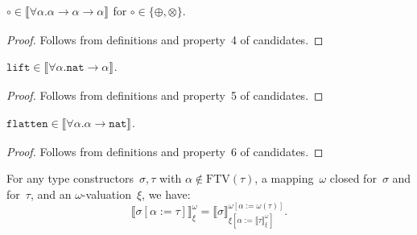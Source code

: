 \documentclass[a4paper,UKenglish,cleveref,autoref,numberwithinsect]{lipics-v2019}
\theoremstyle{definition}
\newcommand{\arrtype}{\rightarrow}
\newcommand{\subst}[2]{#1:=#2}
\newcommand{\nat}{\mathtt{nat}}
\newcommand{\flatten}{\mathtt{flatten}}
\newcommand{\lift}{\mathtt{lift}}
\newcommand{\FTV}{\mathrm{FTV}}
\newcommand{\val}[3]{\ensuremath{\llbracket#1\rrbracket_{#2}^{#3}}}
\begin{document}
\begin{lemma}\label{lem_circ}
  $\circ \in \val{\forall\alpha . \alpha \arrtype \alpha \arrtype
    \alpha}{}{}$ for $\circ \in \{ \oplus, \otimes \}$.
\end{lemma}

\begin{proof}
  Follows from definitions and property~4 of candidates.
\end{proof}

\begin{lemma}\label{lem_lift}
  $\lift \in \val{\forall\alpha.\nat\arrtype\alpha}{}{}$.
\end{lemma}

\begin{proof}
  Follows from definitions and property~5 of candidates.
\end{proof}

\begin{lemma}\label{lem_flatten}
  $\flatten \in \val{\forall\alpha.\alpha\arrtype\nat}{}{}$.
\end{lemma}

\begin{proof}
  Follows from definitions and property~6 of candidates.
\end{proof}

\begin{lemma}\label{lem_val_subst}
  For any type constructors~$\sigma,\tau$ with $\alpha \notin
  \FTV(\tau)$, a mapping~$\omega$ closed for~$\sigma$ and for~$\tau$,
  and an $\omega$-valuation~$\xi$, we have:
  \[
  \val{\sigma[\subst{\alpha}{\tau}]}{\xi}{\omega} =
  \val{\sigma}{\xi[\subst{\alpha}{\val{\tau}{\xi}{\omega}}]}{\omega[\subst{\alpha}{\omega(\tau)}]}.
  \]
\end{lemma}
\end{document}
